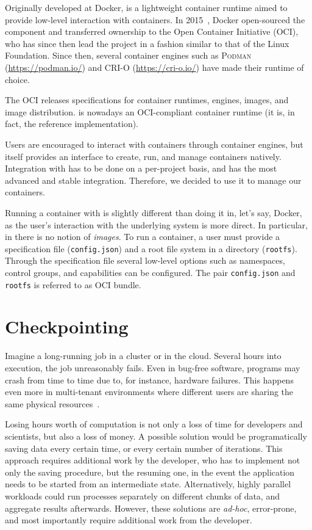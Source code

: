 Originally developed at Docker, \runc is a lightweight container runtime aimed to provide low-level interaction with containers.
In 2015~\cite{introducing-runc}, Docker open-sourced the component and transferred ownership to the Open Container Initiative (OCI), who has since then lead the project in a fashion similar to that of the Linux Foundation.
Since then, several container engines such as \textsc{Podman} (\url{https://podman.io/}) and \textsc{CRI-O} (\url{https://cri-o.io/}) have made \runc their runtime of choice.

The OCI releases specifications for container runtimes, engines, images, and image distribution.
\runc is nowadays an OCI-compliant container runtime (it is, in fact, the reference implementation).

Users are encouraged to interact with containers through container engines, but \runc itself provides an interface to create, run, and manage containers natively.
Integration with \criu has to be done on a per-project basis, and \runc has the most advanced and stable integration.
Therefore, we decided to use it to manage our containers.

Running a container with \runc is slightly different than doing it in, let's say, Docker, as the user's interaction with the underlying system is more direct.
In particular, in \runc there is no notion of \textit{images}.
To run a container, a user must provide a specification file (\texttt{config.json}) and a root file system in a directory (\texttt{rootfs}).
Through the specification file several low-level options such as namespaces, control groups, and capabilities can be configured.
The pair \texttt{config.json} and \texttt{rootfs} is referred to as OCI bundle.

\section{Checkpointing} \label{sec:bg-cp}

Imagine a long-running job in a cluster or in the cloud.
Several hours into execution, the job unreasonably fails.
Even in bug-free software, programs may crash from time to time due to, for instance, hardware failures.
This happens even more in multi-tenant environments where different users are sharing the same physical resources~\cite{Barker2014}.

Losing hours worth of computation is not only a loss of time for developers and scientists, but also a loss of money.
A possible solution would be programatically saving data every certain time, or every certain number of iterations.
This approach requires additional work by the developer, who has to implement not only the saving procedure, but the resuming one, in the event the application needs to be started from an intermediate state.
Alternatively, highly parallel workloads could run processes separately on different chunks of data, and aggregate results afterwards.
However, these solutions are \textit{ad-hoc}, error-prone, and most importantly require additional work from the developer.

